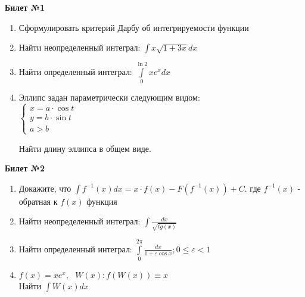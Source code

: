 \documentclass[a4paper, 12pt]{article}
\begin{document}
\begin{center}
    \textbf{Билет №1}
\end{center}
\begin{enumerate}
\item Сформулировать критерий Дарбу об интегрируемости функции
\item Найти неопределенный интеграл: $ \displaystyle \int{x\sqrt{1+3x}}dx$
\item Найти определенный интеграл: $\displaystyle \int\limits_{0}^{\ln{2}}{xe^xdx}$
\item Эллипс задан параметрически следующим видом: \\ 

$
	\begin{cases}
		x = a\cdot\cos{t} \\
		y=b\cdot\sin{t} \\
		a > b
		
	\end{cases}
$

Найти длину эллипса в общем виде.

\end{enumerate}

\begin{center}
	\textbf{Билет №2}
\end{center}
\begin{enumerate}
	\item Докажите, что $\displaystyle \int{f^{-1}(x)}dx = x\cdot f(x) - F(f^{-1}(x)) + C$. где $f^{-1}(x)$ - обратная к $f(x)$ функция
	\item Найти неопределенный интеграл: $\displaystyle \int{\frac{dx}{\sqrt{tg(x)}}}$
	\item Найти определенный интеграл: $\displaystyle \int\limits_{0}^{2\pi}{\frac{dx}{1+\varepsilon \cos{x}}; 0 \le \varepsilon < 1}$
	\item $f(x) = xe^x,\ \ \ W(x): f(W(x)) \equiv x$ \\ Найти $\displaystyle \int{W(x)dx}$
	
\end{enumerate}
\end{document}
